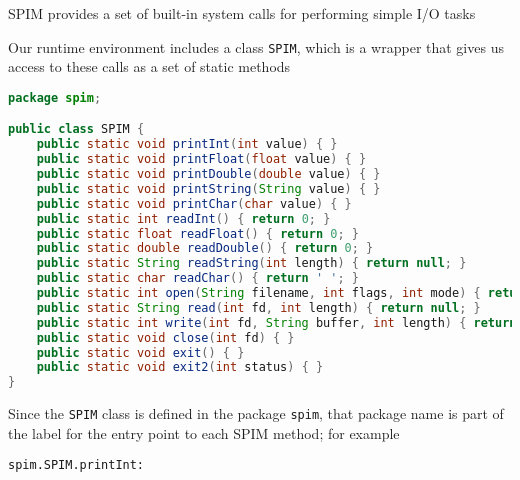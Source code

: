 \documentclass[8pt,a4paper,compress]{beamer}
\begin{document}
\begin{frame}[fragile]
\pause

SPIM provides a set of built-in system calls for performing simple I/O tasks

\pause
\bigskip

Our runtime environment includes a class \lstinline{SPIM}, which is a wrapper that gives us access to these calls as a set of static methods

\begin{lstlisting}[language=Java]
package spim;

public class SPIM {
    public static void printInt(int value) { }
    public static void printFloat(float value) { }
    public static void printDouble(double value) { }
    public static void printString(String value) { }
    public static void printChar(char value) { }
    public static int readInt() { return 0; }
    public static float readFloat() { return 0; }
    public static double readDouble() { return 0; }
    public static String readString(int length) { return null; }
    public static char readChar() { return ' '; }
    public static int open(String filename, int flags, int mode) { return 0; }
    public static String read(int fd, int length) { return null; }
    public static int write(int fd, String buffer, int length) { return 0; }
    public static void close(int fd) { }
    public static void exit() { }
    public static void exit2(int status) { }
}
\end{lstlisting}

\pause
\bigskip

Since the \lstinline{SPIM} class is defined in the package \lstinline{spim}, that package name is part of the label for the entry point to each SPIM method; for example
\begin{lstlisting}[language={}]
spim.SPIM.printInt:
\end{lstlisting}
\end{frame}
\end{document}
